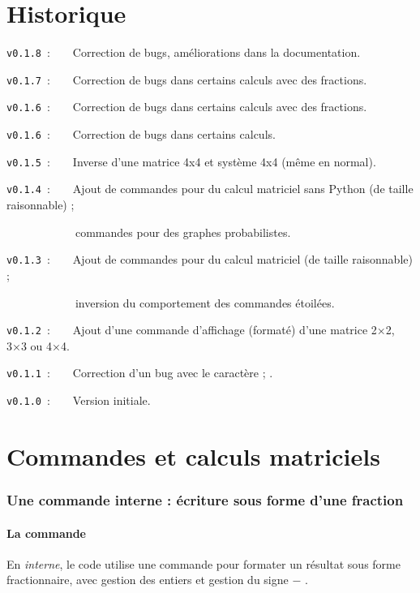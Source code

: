 \documentclass[french,a4paper,11pt]{article}
\begin{document}
\part{Historique}

\verb|v0.1.8|~:~~~~Correction de bugs, améliorations dans la documentation.

\verb|v0.1.7|~:~~~~Correction de bugs dans certains calculs avec des fractions.

\verb|v0.1.6|~:~~~~Correction de bugs dans certains calculs avec des fractions.

\verb|v0.1.6|~:~~~~Correction de bugs dans certains calculs.

\verb|v0.1.5|~:~~~~Inverse d'une matrice 4x4 et système 4x4 (même en normal).

\verb|v0.1.4|~:~~~~Ajout de commandes pour du calcul matriciel sans \textsf{Python} (de taille raisonnable) ;

\verb|      |~~~~~~commandes pour des graphes probabilistes.

\verb|v0.1.3|~:~~~~Ajout de commandes pour du calcul matriciel (de taille raisonnable) ;

\verb|      |~~~~~~inversion du comportement des commandes étoilées.

\verb|v0.1.2|~:~~~~Ajout d'une commande d'affichage (formaté) d'une matrice 2×2, 3×3 ou 4×4.

\verb|v0.1.1|~:~~~~Correction d'un bug avec le caractère \og ; \fg.

\verb|v0.1.0|~:~~~~Version initiale.

\pagebreak

\part{Commandes et calculs matriciels}

\section{Une commande interne : écriture sous forme d'une fraction}

\subsection{La commande}

\begin{cautionblock}
En \textit{interne}, le code utilise une commande pour formater un résultat sous forme fractionnaire, avec gestion des entiers et gestion du signe \og $-$ \fg.
\end{cautionblock}
\end{document}
